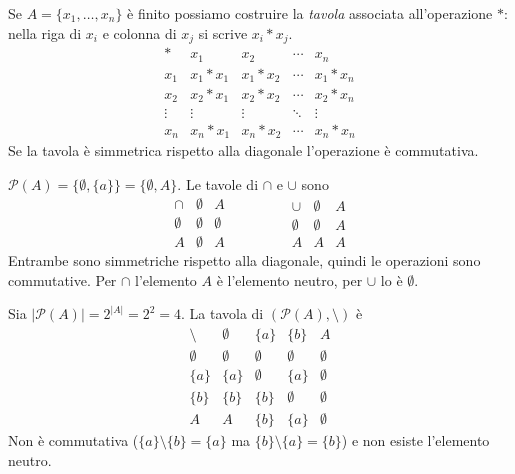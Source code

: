 \documentclass[11pt,a4paper]{article}
\begin{document}
Se $A = \{x_1, \dots, x_n\}$ è finito possiamo costruire la \emph{tavola} associata all'operazione $*$: nella riga di $x_i$ e colonna di $x_j$ si scrive $x_i * x_j$.
\[
\begin{array}{c|cccc}
  * & x_1 & x_2 & \cdots & x_n \\ \hline
  x_1 & x_1 * x_1 & x_1 * x_2 & \cdots & x_1 * x_n \\
  x_2 & x_2 * x_1 & x_2 * x_2 & \cdots & x_2 * x_n \\
  \vdots & \vdots & \vdots & \ddots & \vdots \\
  x_n & x_n * x_1 & x_n * x_2 & \cdots & x_n * x_n
\end{array}
\]
Se la tavola è simmetrica rispetto alla diagonale l'operazione è commutativa.

\begin{esempio}[$A = \{a\}$]
$\mathcal{P}(A) = \{\emptyset, \{a\}\} = \{\emptyset, A\}$. Le tavole di $\cap$ e $\cup$ sono
\[
\begin{array}{c|cc}
  \cap & \emptyset & A \\ \hline
  \emptyset & \emptyset & \emptyset \\
  A & \emptyset & A
\end{array}
\qquad\qquad
\begin{array}{c|cc}
  \cup & \emptyset & A \\ \hline
  \emptyset & \emptyset & A \\
  A & A & A
\end{array}
\]
Entrambe sono simmetriche rispetto alla diagonale, quindi le operazioni sono commutative. Per $\cap$ l'elemento $A$ è l'elemento neutro, per $\cup$ lo è $\emptyset$.
\end{esempio}

\begin{esempio}[$A = \{a, b\}$, differenza insiemistica]
Sia $|\mathcal{P}(A)| = 2^{|A|} = 2^2 = 4$. La tavola di $(\mathcal{P}(A), \setminus)$ è
\[
\begin{array}{c|cccc}
  \setminus & \emptyset & \{a\} & \{b\} & A \\ \hline
  \emptyset & \emptyset & \emptyset & \emptyset & \emptyset \\
  \{a\} & \{a\} & \emptyset & \{a\} & \emptyset \\
  \{b\} & \{b\} & \{b\} & \emptyset & \emptyset \\
  A & A & \{b\} & \{a\} & \emptyset
\end{array}
\]
Non è commutativa ($\{a\}\setminus\{b\} = \{a\}$ ma $\{b\}\setminus\{a\} = \{b\}$) e non esiste l'elemento neutro.
\end{esempio}
\end{document}
